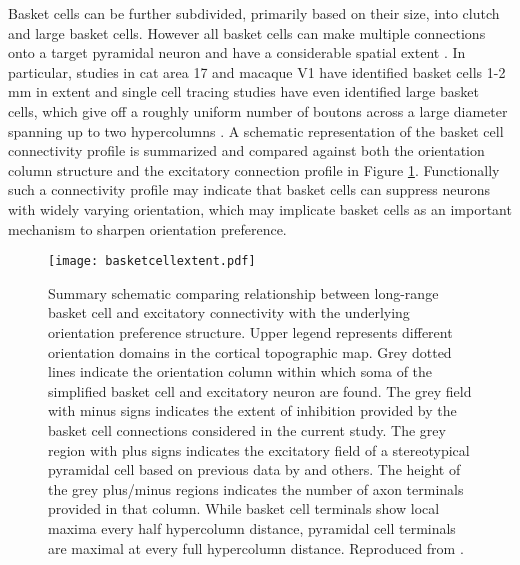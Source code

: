 Basket cells can be further subdivided, primarily based on their size,
into clutch and large basket cells. However all basket cells can make
multiple connections onto a target pyramidal neuron
\citep{Somogyi1983} and have a considerable spatial extent
\citep{Kisvarday2002}. In particular, studies in cat area 17 and
macaque V1 have identified basket cells 1-2 mm in extent
\citep{Somogyi1983,Lund1987,Lund1991,Martin1983} and single cell
tracing studies have even identified large basket cells, which give
off a roughly uniform number of boutons across a large diameter
spanning up to two hypercolumns \citep{Buzas2001}. A schematic
representation of the basket cell connectivity profile is summarized
and compared against both the orientation column structure and the
excitatory connection profile in Figure
\ref{BasketCellExtent}. Functionally such a connectivity profile may
indicate that basket cells can suppress neurons with widely varying
orientation, which may implicate basket cells as an important
mechanism to sharpen orientation preference.

\begin{figure}
	\centering
        \texttt{[image: basketcellextent.pdf]}
	\caption{Summary schematic comparing relationship between
        long-range basket cell and excitatory connectivity with the
        underlying orientation preference structure. Upper legend
        represents different orientation domains in the cortical
        topographic map. Grey dotted lines indicate the orientation
        column within which soma of the simplified basket cell and
        excitatory neuron are found. The grey field with minus signs
        indicates the extent of inhibition provided by the basket cell
        connections considered in the current study. The grey region
        with plus signs indicates the excitatory field of a
        stereotypical pyramidal cell based on previous data by
        \cite{Bosking1997,Kisvarday1997a} and others. The height of
        the grey plus/minus regions indicates the number of axon
        terminals provided in that column. While basket cell terminals
        show local maxima every half hypercolumn distance, pyramidal
        cell terminals are maximal at every full hypercolumn
        distance. Reproduced from \cite{Buzas2001}.}
	\label{BasketCellExtent}
\end{figure}

